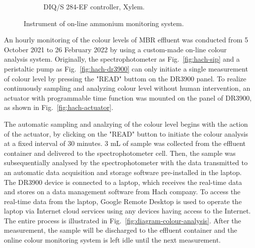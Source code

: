 \begin{figure}[h]
\begin{subfigure}{0.3\textwidth}
      \caption{DIQ/S 284-EF controller, Xylem.} \label{fig:nh3-sensor-b}
    \end{subfigure}%
  \caption{Instrument of on-line ammonium monitoring system.} \label{fig:nh3-sensor}
\end{figure}

An hourly monitoring of the colour levels of MBR effluent was conducted from 5 October 2021 to 26 February 2022 by using a custom-made on-line colour analysis system. Originally, the spectrophotometer as Fig.~\ref{fig:hach-sip} and a peristaltic pump as Fig.~\ref{fig:hach-dr3900} can only initiate a single measurement of colour level by pressing the "READ" buttom on the DR3900 panel. To realize continuously sampling and analyzing colour level without human intervention, an actuator with programmable time function was mounted on the panel of DR3900, as shown in Fig.~\ref{fig:hach-actuator}. 

The automatic sampling and analzying of the colour level begins with the action of the actuator, by clicking on the "READ" button to initiate the colour analysis at a fixed interval of 30 minutes. 3 mL of sample was collected from the effluent container and delivered to the spectrophotometer cell. Then, the sample was subsequentially analysed by the spectrophotometer with the data transmitted to an automatic data acquisition and storage software pre-installed in the laptop. The DR3900 device is connected to a laptop, which receives the real-time data and stores on a data management software from Hach company. To access the real-time data from the laptop, Google Remote Desktop is used to operate the laptop via Internet cloud services using any devices having access to the Internet. The entire process is illustrated in Fig.~\ref{fig:diagram-colour-analysis}. After the measurement, the sample will be discharged to the effluent container and the online colour monitoring system is left idle until the next measurement. 

